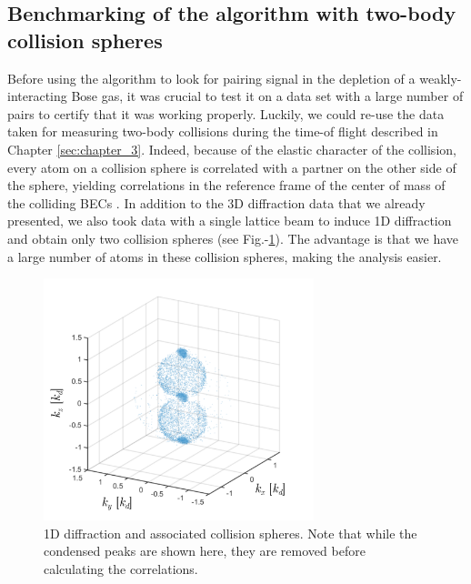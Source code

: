 \subsection{Benchmarking of the algorithm with two-body collision spheres}

\label{sec:benchmark_algo}

Before using the algorithm to look for \kmk pairing signal in the depletion of a weakly-interacting Bose gas, it was crucial to test it on a data set with a large number of \kmk pairs to certify that it was working properly. Luckily, we could re-use the data taken for measuring two-body collisions during the time-of flight described in Chapter \ref{sec:chapter_3}. Indeed, because of the elastic character of the collision, every atom on a collision sphere is correlated with a partner on the other side of the sphere, yielding \kmk correlations in the reference frame of the center of mass of the colliding BECs \cite{hodgman2017solving,perrin2007observation}. In addition to the 3D diffraction data that we already presented, we also took data with a single lattice beam to induce 1D diffraction and obtain only two collision spheres (see Fig.-\ref{fig:1D_spheres}). The advantage is that we have a large number of atoms in these collision spheres, making the analysis easier. 

\begin{figure}
    \centering
    \includegraphics[width=0.7\textwidth]{Fig/Chapter4/1d_spheres.png}
    \caption[1D diffraction and associated collision spheres]{1D diffraction and associated collision spheres. Note that while the condensed peaks are shown here, they are removed before calculating the correlations.}
    \label{fig:1D_spheres}
\end{figure}


